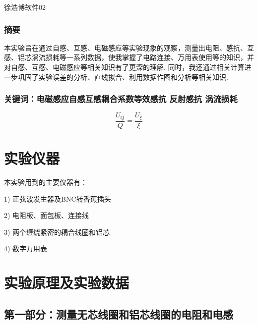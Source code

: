 \documentclass[UTF8]{ctexart}
\begin{document}
\renewcommand{\thefootnote}{\fnsymbol{footnote}}
\linespread{1.4}
\title{\vspace{-5em}\vspace{-2.5em}}
\date{}
\maketitle
\begin{center}
{\fangsong 徐浩博\quad 软件02}
\end{center}

\subsubsection*{摘要}
{\kaishu\normalsize  本实验旨在通过自感、互感、电磁感应等实验现象的观察，测量出电阻、感抗、互感、铝芯涡流损耗等一系列数据，使我掌握了电路连接、万用表使用等的知识，并对自感、互感、电磁感应等相关知识有了更深的理解. 同时，我还通过相关计算进一步巩固了实验误差的分析、直线拟合、利用数据作图和分析等相关知识.}
\subsubsection*{关键词：电磁感应\quad 自感\quad  互感\quad  耦合系数\quad 等效感抗 \quad 反射感抗 \quad  涡流损耗\vspace{1.5em}}

\[\frac{U_Q}{Q}=\frac{U_\xi}{\xi}\]
\section{实验仪器}
本实验用到的主要仪器有：\par
1) 正弦波发生器及BNC转香蕉插头\par
2) 电阻板、面包板、连接线\par
3) 两个缠绕紧密的耦合线圈和铝芯\par
4) 数字万用表

\section{实验原理及实验数据}

\subsection*{第一部分：测量无芯线圈和铝芯线圈的电阻和电感}
\end{document}
